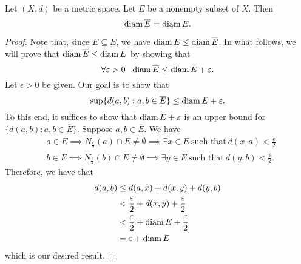 \documentclass[a4paper]{article}
\begin{document}
\begin{theorem}[ ]
    Let \( (X,d) \) be a metric space. Let \( E  \) be a nonempty subset of \( X  \). Then 
    \[  \operatorname{diam} \overline{E} = \operatorname{diam} E.  \]
\end{theorem}
\begin{proof}
Note that, since \( E \subseteq \overline{E} \), we have \( \operatorname{diam} E \leq \operatorname{diam} \overline{E} \). In what follows, we will prove that \( \operatorname{diam} \overline{E} \leq \operatorname{diam} E  \) by showing that 
\[  \forall \varepsilon > 0  \ \ \operatorname{diam} \overline{E} \leq \operatorname{diam} E + \varepsilon. \]
Let \( \epsilon > 0  \) be given. Our goal is to show that 
\[  \sup \{ d(a,b) : a, b \in \overline{E} \} \leq \operatorname{diam} E + \varepsilon. \]
To this end, it suffices to show that \( \operatorname{diam} E + \varepsilon  \) is an upper bound for \( \{ d(a,b) : a,b \in \overline{E} \}  \). Suppose \( a,b \in \overline{E} \). We have 
\begin{align*}
    &a \in \overline{E} \implies {N}_{\frac{ \epsilon }{ 2 } }(a) \cap E \neq \emptyset \implies \exists x \in E \ \text{such that} \ d(x,a) < \frac{ \epsilon }{ 2 }  \\
    &b \in \overline{E} \implies  {N}_{\frac{ \epsilon }{ 2 } }(b) \cap E \neq \emptyset  \implies \exists y \in E \ \text{such that} \ d(y,b) < \frac{ \epsilon }{ 2 }.
\end{align*}
Therefore, we have that 
\begin{align*}
    d(a,b) &\leq d(a,x) + d(x,y) + d(y,b) \\
           &< \frac{ \varepsilon  }{ 2 }  + d(x,y) + \frac{ \varepsilon }{ 2 } \\
           &< \frac{ \varepsilon  }{ 2  }  + \operatorname{diam} E + \frac{ \varepsilon }{ 2 }  \\
           &= \varepsilon + \operatorname{diam} E 
\end{align*}
which is our desired result.
\end{proof}
\end{document}
